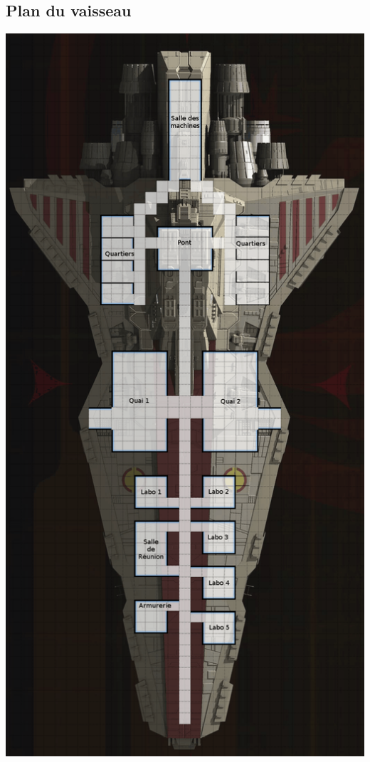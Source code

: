 \subsection{Plan du vaisseau}
\noindent\includegraphics[width=\linewidth]{_img/dos-au-muur/venator-plan.png}

